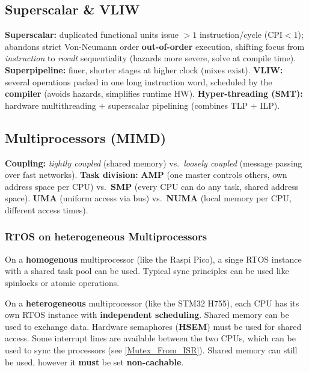 \subsection{Superscalar \& VLIW}
\textbf{Superscalar:} duplicated functional units issue $>1$ instruction/cycle ($\text{CPI}<1$); 
abandons strict Von-Neumann order \textrightarrow{} \textbf{out-of-order} execution, shifting focus from \emph{instruction} to 
\emph{result} sequentiality (hazards more severe, solve at compile time). \textbf{Superpipeline:} finer, shorter stages at higher clock (mixes exist). 
\textbf{VLIW:} several operations packed in one long instruction word, scheduled by the \textbf{compiler} (avoids hazards, simplifies runtime HW). 
\textbf{Hyper-threading (SMT):} hardware multithreading $+$ superscalar pipelining (combines TLP $+$ ILP).


\subsection{Multiprocessors (MIMD)}
\begin{outline}
  \1 \textbf{Coupling:} \emph{tightly coupled} (shared memory) vs.\ \emph{loosely coupled} (message passing over fast networks).
  \1 \textbf{Task division:} \textbf{AMP} (one master controls others, own address space per CPU) vs.\ \textbf{SMP} (every CPU can do any task, shared address space).
  \1 \textbf{UMA} (uniform access via bus) vs.\ \textbf{NUMA} (local memory per CPU, different access times).
\end{outline}

\subsubsection{RTOS on heterogeneous Multiprocessors}

On a \textbf{homogenous} multiprocessor (like the Raspi Pico), a singe RTOS instance with a shared task pool can be used.
Typical sync principles can be used like spinlocks or atomic operations.

On a \textbf{heterogeneous} multiprocessor (like the STM32 H755), each CPU has its own RTOS instance with \textbf{independent scheduling}.
Shared memory can be used to exchange data.
Hardware semaphores (\textbf{HSEM}) must be used for shared access.
Some interrupt lines are available between the two CPUs, which can be used to sync the processors (see \ref{Mutex_From_ISR}).
Shared memory can still be used, however it \textbf{must} be set \textbf{non-cachable}.

